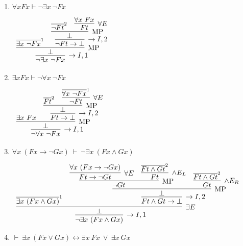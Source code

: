 \documentclass[11pt]{report}
\newcommand{\temp}[2]{{\overline{#2}}^{#1}}
\begin{document}
\begin{enumerate}
\begin{enumerate}
			\item $\forall x Fx \vdash \lnot \exists x \ \lnot Fx$ 
			
			\begin{center}
				$\begin{array}{c}
					\infer[\to I,1]{\lnot \exists x \ \lnot Fx}
						{\infer[\MP]{\bot}
							{\temp{1}{\exists x \ \lnot Fx}
							&
							\infer[\to I,2]{\lnot Ft \to \bot}
								{\infer[\MP]{\bot}
									{\temp{2}{\lnot Ft}
									&
									\infer[\forall E]{Ft}
										{\forall x \ Fx}}}}}
				\end{array}$
			\end{center}
			
			\newpage
			\item $\exists x Fx \vdash \lnot \forall x \ \lnot Fx$
			
			\begin{center}
				$\begin{array}{c}
					\infer[\to I,1]{\lnot \forall x \ \lnot Fx}
						{\infer[\MP]{\bot}
							{\exists x \ Fx
							&
							\infer[\to I,2]{Ft \to \bot}
								{\infer[\MP]{\bot}
									{\temp{2}{Ft}
									&
									\infer[\forall E]{\lnot Ft}
										{\temp{1}{\forall x \ \lnot Fx}}}}}}
				\end{array}$
			\end{center}
			
			\item $\forall x \ (Fx \to \lnot Gx) \ \vdash \ \lnot \exists x \ (Fx \land Gx)$
			
			\begin{center}
				$\begin{array}{c}
					\infer[\to I,1]{\lnot \exists x \ (Fx \land Gx)}
						{\infer[\exists E]{\bot}
							{\temp{1}{\exists x \ (Fx \land Gx)}
							&
							\infer[\to I,2]{Ft \land Gt \to \bot}
								{\infer[\MP]{\bot}
									{\infer[\MP]{\lnot Gt}
										{\infer[\forall E]{Ft \to \lnot Gt}
											{\forall x \ (Fx \to \lnot Gx)}
										&
										\infer[\land E_{L}]{Ft}
											{\temp{2}{Ft \land Gt}}}
									&
									\infer[\land E_{R}]{Gt}
										{\temp{2}{Ft \land Gt}}}}}}
				\end{array}$
			\end{center}

			\item $\vdash \ \exists x \ (Fx \lor Gx) \leftrightarrow \exists x \ Fx \ \lor \ \exists x \ Gx$
			
			\begin{center}
				$\begin{array}{c}
					\infer[]{}
						{}
				\end{array}$
			\end{center}
		\end{enumerate}	


\end{enumerate}
\end{document}

